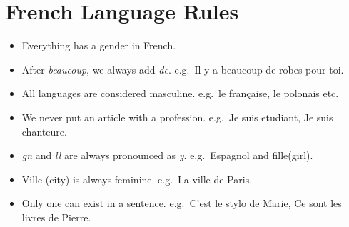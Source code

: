 \section{French Language Rules}

\begin{itemize}

\item{Everything has a gender in French.}

\item{After \emph{beaucoup}, we always add \emph{de}. e.g.\ Il y a beaucoup de
robes pour toi.}

\item{All languages are considered masculine. e.g.\ le fran\c{c}aise, le polonais
etc.}

\item{We never put an article with a profession. e.g.\ Je suis etudiant, Je suis chanteure.}

\item{\emph{gn} and \emph{ll} are always pronounced as \emph{y}. e.g.\ Espagnol and fille(girl).}

\item{Ville (city) is always feminine. e.g.\ La ville de Paris.}

\item{Only one can exist in a sentence. e.g.\ C'est le stylo de Marie, Ce sont les livres de Pierre.}

\end{itemize}
